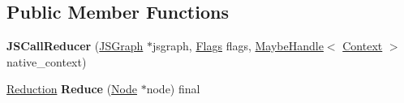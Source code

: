 \subsection*{Public Member Functions}
\begin{DoxyCompactItemize}
\item 
{\bfseries J\+S\+Call\+Reducer} (\hyperlink{classv8_1_1internal_1_1compiler_1_1_j_s_graph}{J\+S\+Graph} $\ast$jsgraph, \hyperlink{classv8_1_1base_1_1_flags}{Flags} flags, \hyperlink{classv8_1_1internal_1_1_maybe_handle}{Maybe\+Handle}$<$ \hyperlink{classv8_1_1internal_1_1_context}{Context} $>$ native\+\_\+context)\hypertarget{classv8_1_1internal_1_1compiler_1_1_j_s_call_reducer_ad6eae642a8a0e8b431765907f9b3bdf2}{}\label{classv8_1_1internal_1_1compiler_1_1_j_s_call_reducer_ad6eae642a8a0e8b431765907f9b3bdf2}

\item 
\hyperlink{classv8_1_1internal_1_1compiler_1_1_reduction}{Reduction} {\bfseries Reduce} (\hyperlink{classv8_1_1internal_1_1compiler_1_1_node}{Node} $\ast$node) final\hypertarget{classv8_1_1internal_1_1compiler_1_1_j_s_call_reducer_abf441e16cdaa5b1d3be850e853803674}{}\label{classv8_1_1internal_1_1compiler_1_1_j_s_call_reducer_abf441e16cdaa5b1d3be850e853803674}

\end{DoxyCompactItemize}
